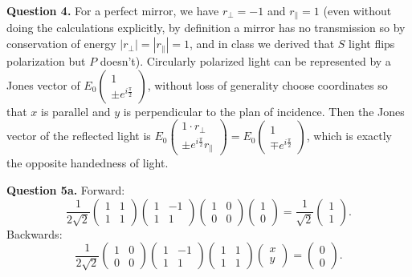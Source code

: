 \documentclass[letterpaper, reqno,11pt]{article}
\begin{document}
{\medskip\noindent\bf Question 4.} For a perfect mirror, we have $r_{\perp}=-1$ and $r_{\parallel}=1$ (even without doing the calculations explicitly, by definition a mirror has no transmission so by conservation of energy $|r_{\perp}|=|r_{\parallel}|=1$, and in class we derived that $S$ light flips polarization but $P$ doesn't). Circularly polarized light can be represented by a Jones vector of $E_0\begin{pmatrix} 1\\ \pm e^{i \frac{\pi}{2}} \end{pmatrix}$, without loss of generality choose coordinates so that $x$ is parallel and $y$ is perpendicular to the plan of incidence. Then the Jones vector of the reflected light is $E_0 \begin{pmatrix} 1\cdot r_{\perp}\\ \pm e^{i \frac{\pi}{2}}r_{\parallel} \end{pmatrix} =E_0 \begin{pmatrix} 1\\ \mp e^{i \frac{\pi}{2}} \end{pmatrix} $, which is exactly the opposite handedness of light.

{\medskip\noindent\bf Question 5a.} Forward:
\[
    \frac{1}{2\sqrt{2}}\begin{pmatrix} 1&1\\1&1 \end{pmatrix} \begin{pmatrix} 1&-1\\1&1 \end{pmatrix}\begin{pmatrix} 1&0\\0&0 \end{pmatrix}\begin{pmatrix} 1\\0 \end{pmatrix} =\frac{1}{\sqrt{2}}\begin{pmatrix} 1\\1 \end{pmatrix} 
.\]
Backwards:
\[
\frac{1}{2\sqrt{2}}\begin{pmatrix} 1&0\\0&0 \end{pmatrix}\begin{pmatrix} 1&-1\\1&1 \end{pmatrix}\begin{pmatrix} 1&1\\1&1 \end{pmatrix}\begin{pmatrix} x\\y \end{pmatrix}=\begin{pmatrix} 0\\0 \end{pmatrix} 
.\]
\end{document}
